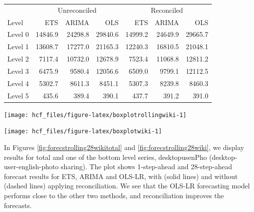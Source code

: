 \documentclass[11pt,a4paper,]{article}
\let\origfigure\figure
\let\endorigfigure\endfigure
\renewenvironment{figure}[1][2] {
    \expandafter\origfigure\expandafter[!htbp]
} {
    \endorigfigure
}
\let\origtable\table
\let\endorigtable\endtable
\renewenvironment{table}[1][2] {
    \expandafter\origtable\expandafter[!htbp]
} {
    \endorigtable
}
\begin{document}
\begin{table}[t]

\caption{\label{tab:wikipediadataresultRMSE}Mean(RMSE) for ETS, ARIMA and OLS with and without reconciliation - 28-step-ahead - Wikipedia dataset}
\centering
\begin{tabular}{lrrrrrr}
\toprule
\multicolumn{1}{c}{} & \multicolumn{3}{c}{Unreconciled} & \multicolumn{3}{c}{Reconciled} \\
\cmidrule(l{3pt}r{3pt}){2-4} \cmidrule(l{3pt}r{3pt}){5-7}
Level & ETS & ARIMA & OLS & ETS & ARIMA & OLS\\
\midrule
Level 0 & 14846.9 & 24298.8 & 29840.6 & 14999.2 & 24649.9 & 29665.7\\
Level 1 & 13608.7 & 17277.0 & 21165.3 & 12240.3 & 16810.5 & 21048.1\\
Level 2 & 7117.4 & 10732.0 & 12678.9 & 7523.4 & 11068.8 & 12811.2\\
Level 3 & 6475.9 & 9580.4 & 12056.6 & 6509.0 & 9799.1 & 12112.5\\
Level 4 & 5302.7 & 8611.3 & 8451.1 & 5307.3 & 8239.8 & 8460.3\\
Level 5 & 435.6 & 389.4 & 390.1 & 437.7 & 391.2 & 391.0\\
\bottomrule
\end{tabular}
\end{table}

\begin{figure}

{\centering \texttt{[image: hcf\_files/figure-latex/boxplotrollingwiki-1]} 

}

\caption{Box plots of forecast errors for reconciled and unreconciled ETS, ARIMA and OLS methods at each hierarchical level for 1-step-ahead Wikipedia pageviews.}\label{fig:boxplotrollingwiki}
\end{figure}

\begin{figure}

{\centering \texttt{[image: hcf\_files/figure-latex/boxplotwiki-1]} 

}

\caption{Box plots of forecast errors for reconciled and unreconciled ETS, ARIMA and OLS methods at each hierarchical level for 28-step-ahead Wikipedia pageviews.}\label{fig:boxplotwiki}
\end{figure}

In Figures \ref{fig:forecstrolling28wikitotal} and \ref{fig:forecstrolling28wiki}, we display results for total and one of the bottom level series, desktopusenPho (desktop-user-english-photo sharing). The plot shows 1-step-ahead and 28-step-ahead forecast results for ETS, ARIMA and OLS-LR, with (solid lines) and without (dashed lines) applying reconciliation. We see that the OLS-LR forecasting model performs close to the other two methods, and reconciliation improves the forecasts.
\end{document}
